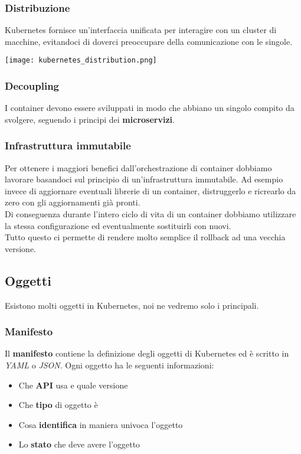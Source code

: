 \subsubsection{Distribuzione}
Kubernetes fornisce un'interfaccia unificata per interagire con un cluster di macchine, evitandoci di doverci preoccupare della comunicazione con le singole.
\begin{center}
	\texttt{[image: kubernetes\_distribution.png]}
\end{center}
\subsubsection{Decoupling}
I container devono essere sviluppati in modo che abbiano un singolo compito da svolgere, seguendo i principi dei \textbf{microservizi}.
\subsubsection{Infrastruttura immutabile}
Per ottenere i maggiori benefici dall'orchestrazione di container dobbiamo lavorare basandoci sul principio di un'infrastruttura immutabile. Ad esempio invece di aggiornare eventuali librerie di un container, distruggerlo e ricrearlo da zero con gli aggiornamenti già pronti.\\
Di conseguenza durante l'intero ciclo di vita di un container dobbiamo utilizzare la stessa configurazione ed eventualmente sostituirli con nuovi. \\
Tutto questo ci permette di rendere molto semplice il rollback ad una vecchia versione.
\subsection{Oggetti}
Esistono molti oggetti in Kubernetes, noi ne vedremo solo i principali.
\subsubsection{Manifesto}
Il \textbf{manifesto} contiene la definizione degli oggetti di Kubernetes ed è scritto in \textit{YAML} o \textit{JSON}. Ogni oggetto ha le seguenti informazioni:
\begin{itemize}
	\item Che \textbf{API} usa e quale versione
	\item Che \textbf{tipo} di oggetto è
	\item Cosa \textbf{identifica} in maniera univoca l'oggetto
	\item Lo \textbf{stato} che deve avere l'oggetto
\end{itemize}

